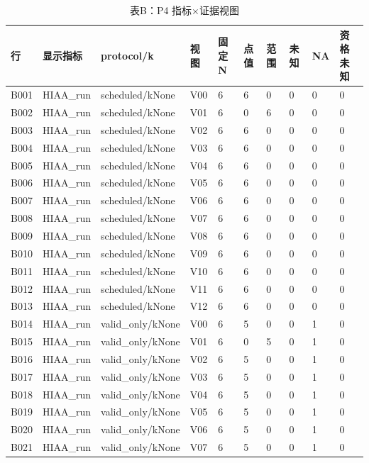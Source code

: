 \begin{longtable}{llllllllll}
\caption{表B：P4 指标×证据视图}\\
\hline
行 & 显示指标 & protocol/k & 视图 & 固定N & 点值 & 范围 & 未知 & NA & 资格未知 \\
\hline\endhead
B001 & HIAA\_run & scheduled/kNone & V00 & 6 & 6 & 0 & 0 & 0 & 0 \\
B002 & HIAA\_run & scheduled/kNone & V01 & 6 & 0 & 6 & 0 & 0 & 0 \\
B003 & HIAA\_run & scheduled/kNone & V02 & 6 & 6 & 0 & 0 & 0 & 0 \\
B004 & HIAA\_run & scheduled/kNone & V03 & 6 & 6 & 0 & 0 & 0 & 0 \\
B005 & HIAA\_run & scheduled/kNone & V04 & 6 & 6 & 0 & 0 & 0 & 0 \\
B006 & HIAA\_run & scheduled/kNone & V05 & 6 & 6 & 0 & 0 & 0 & 0 \\
B007 & HIAA\_run & scheduled/kNone & V06 & 6 & 6 & 0 & 0 & 0 & 0 \\
B008 & HIAA\_run & scheduled/kNone & V07 & 6 & 6 & 0 & 0 & 0 & 0 \\
B009 & HIAA\_run & scheduled/kNone & V08 & 6 & 6 & 0 & 0 & 0 & 0 \\
B010 & HIAA\_run & scheduled/kNone & V09 & 6 & 6 & 0 & 0 & 0 & 0 \\
B011 & HIAA\_run & scheduled/kNone & V10 & 6 & 6 & 0 & 0 & 0 & 0 \\
B012 & HIAA\_run & scheduled/kNone & V11 & 6 & 6 & 0 & 0 & 0 & 0 \\
B013 & HIAA\_run & scheduled/kNone & V12 & 6 & 6 & 0 & 0 & 0 & 0 \\
B014 & HIAA\_run & valid\_only/kNone & V00 & 6 & 5 & 0 & 0 & 1 & 0 \\
B015 & HIAA\_run & valid\_only/kNone & V01 & 6 & 0 & 5 & 0 & 1 & 0 \\
B016 & HIAA\_run & valid\_only/kNone & V02 & 6 & 5 & 0 & 0 & 1 & 0 \\
B017 & HIAA\_run & valid\_only/kNone & V03 & 6 & 5 & 0 & 0 & 1 & 0 \\
B018 & HIAA\_run & valid\_only/kNone & V04 & 6 & 5 & 0 & 0 & 1 & 0 \\
B019 & HIAA\_run & valid\_only/kNone & V05 & 6 & 5 & 0 & 0 & 1 & 0 \\
B020 & HIAA\_run & valid\_only/kNone & V06 & 6 & 5 & 0 & 0 & 1 & 0 \\
B021 & HIAA\_run & valid\_only/kNone & V07 & 6 & 5 & 0 & 0 & 1 & 0 \\

\end{longtable}
